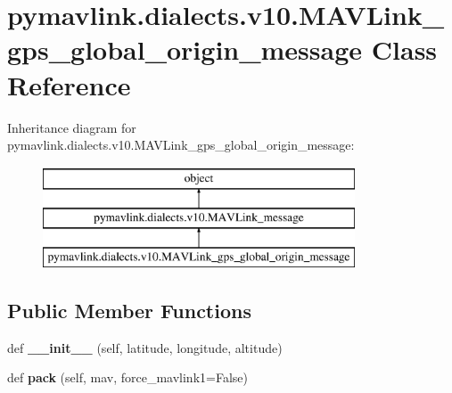 \hypertarget{classpymavlink_1_1dialects_1_1v10_1_1MAVLink__gps__global__origin__message}{}\section{pymavlink.\+dialects.\+v10.\+M\+A\+V\+Link\+\_\+gps\+\_\+global\+\_\+origin\+\_\+message Class Reference}
\label{classpymavlink_1_1dialects_1_1v10_1_1MAVLink__gps__global__origin__message}
Inheritance diagram for pymavlink.\+dialects.\+v10.\+M\+A\+V\+Link\+\_\+gps\+\_\+global\+\_\+origin\+\_\+message\+:\begin{figure}[H]
\begin{center}
\leavevmode
\includegraphics[height=3.000000cm]{classpymavlink_1_1dialects_1_1v10_1_1MAVLink__gps__global__origin__message}
\end{center}
\end{figure}
\subsection*{Public Member Functions}
\begin{DoxyCompactItemize}
\item 
\mbox{\label{classpymavlink_1_1dialects_1_1v10_1_1MAVLink__gps__global__origin__message_a2d1f0f97b3265249f4f64e1fa31a8743}} 
def {\bfseries \+\_\+\+\_\+init\+\_\+\+\_\+} (self, latitude, longitude, altitude)
\item 
\mbox{\label{classpymavlink_1_1dialects_1_1v10_1_1MAVLink__gps__global__origin__message_a7e16448d9c9355d20a05c60abf651e74}} 
def {\bfseries pack} (self, mav, force\+\_\+mavlink1=False)
\end{DoxyCompactItemize}
